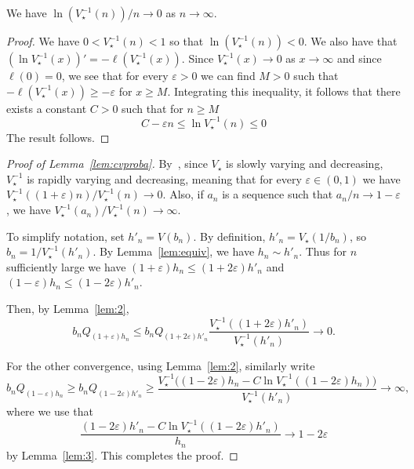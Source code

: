 \documentclass[AHL,Unicode,longabstracts,published]{cedram}
\newcommand*{\MK}{\mkern 2mu}
\begin{document}
\begin{lemm}\label{lem:3}
We have $\ln(V_{\star}^{-1}(n))/n \rightarrow 0$ as $ n \rightarrow \infty$.
\end{lemm}

\begin{proof}
We have $0<V_{\star}^{-1}(n)<1$ so that $\ln(V_{\star}^{-1}(n))<0$. We also have that $(\ln V_{\star}^{-1}(x))'=-\ell(V_{\star}^{-1}(x))$. Since $V_{\star}^{-1}(x) \rightarrow 0$ as $x \rightarrow \infty$ and since $\ell(0)=0$, we see that for every $\varepsilon>0$ we can find $M>0$ such that $-\ell(V_{\star}^{-1}(x)) \geq -\varepsilon$ for $x \geq M$. Integrating this inequality, it follows that there exists a constant $C>0$ such that for $n \geq M$
\[
C -\varepsilon n \leq \ln V_{\star}^{-1}(n) \leq 0
\]
The result follows.
\end{proof}


\begin{proof}[Proof of Lemma~\ref{lem:cvproba}]
By~\cite[Theorem~2.4.7$\MK$(i) and Eq.~(2.4.3)]{BGT89}, since $V_{\star}$ is slowly varying and decreasing, $V_{\star}^{-1}$ is rapidly varying and decreasing, meaning that for every $\varepsilon \in (0,1)$ we have $V_{\star}^{-1}((1+\varepsilon) n)/V_{\star}^{-1}(n) \rightarrow 0$. Also, if $a_{n}$ is a sequence such that $a_{n}/n \rightarrow 1-\varepsilon$, we have $V_{\star}^{-1}(a_{n })/V_{\star}^{-1}(n) \rightarrow \infty$.

To simplify notation, set $h'_{n}=V(b_{n})$. By definition, $h'_{n}=V_{\star}(1/b_n)$, so $b_n=1/V_{\star}^{-1}(h'_{n})$. By Lemma~\ref{lem:equiv}, we have $h_n \sim h'_{n}$. Thus for $n$ sufficiently large we have $ (1+\varepsilon) h_{n} \leq (1+2\varepsilon) h'_{n}$ and$ (1-\varepsilon) h_{n} \leq (1-2\varepsilon) h'_{n}$.



Then, by Lemma~\ref{lem:2},
\[
b_{n} Q_{(1+\varepsilon)h_{n}} \leq b_{n} Q_{(1+2\varepsilon)h'_{n}} \frac{V_{\star}^{-1}((1+2\varepsilon)h'_{n})}{V_{\star}^{-1}(h'_{n})}  \longrightarrow 0.
\]

For the other convergence, using Lemma~\ref{lem:2}, similarly write
\[
b_{n} Q_{(1-\varepsilon)h_{n}} \geq b_{n} Q_{(1-2\varepsilon)h'_{n}} \geq \frac{V_{\star}^{-1}\big((1-2\varepsilon)h_{n} - C \ln V_{\star}^{-1}((1-2\varepsilon)h_{n})\big)}{V_{\star}^{-1}(h'_{n})}  \longrightarrow \infty,
\]
where we use that
\[
\frac{ (1-2\varepsilon)h'_{n} - C \ln V_{\star}^{-1}((1-2\varepsilon)h'_{n})}{h_n} \to 1-2\varepsilon
\]
by Lemma~\ref{lem:3}. This completes the proof.
\end{proof}
\end{document}
